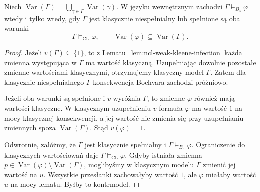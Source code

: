 \begin{twierdzenie}
\label{thm:ncl-bochvar-variable-inclusion}
Niech $\operatorname{Var}(\Gamma)=
\bigcup_{\gamma\in\Gamma}\operatorname{Var}(\gamma)$.
W języku wewnętrznym zachodzi
$\Gamma\models_{B_3}\varphi$ wtedy i tylko wtedy,
gdy $\Gamma$ jest klasycznie niespełnialny
lub spełnione są oba warunki
\[
 \Gamma\models_{\mathrm{CL}}\varphi,\qquad
 \operatorname{Var}(\varphi)\subseteq
 \operatorname{Var}(\Gamma).
\]
\end{twierdzenie}
\begin{proof}
Jeżeli $v(\Gamma)\subseteq\{1\}$, to z
Lematu~\ref{lem:ncl-weak-kleene-infection}
każda zmienna występująca w $\Gamma$ ma wartość
klasyczną. Uzupełniając dowolnie pozostałe zmienne
wartościami klasycznymi, otrzymujemy klasyczny
model $\Gamma$. Zatem dla klasycznie niespełnialnego
$\Gamma$ konsekwencja Bochvara zachodzi próżniowo.

Jeżeli oba warunki są spełnione i $v$ wyróżnia
$\Gamma$, to zmienne $\varphi$ również mają
wartości klasyczne. W klasycznym uzupełnieniu
$v$ formuła $\varphi$ ma wartość $1$ na mocy
klasycznej konsekwencji, a jej wartość nie zmienia
się przy uzupełnianiu zmiennych spoza
$\operatorname{Var}(\Gamma)$. Stąd $v(\varphi)=1$.

Odwrotnie, załóżmy, że $\Gamma$ jest klasycznie
spełnialny i $\Gamma\models_{B_3}\varphi$.
Ograniczenie do klasycznych wartościowań daje
$\Gamma\models_{\mathrm{CL}}\varphi$.
Gdyby istniała zmienna
$p\in\operatorname{Var}(\varphi)\setminus
\operatorname{Var}(\Gamma)$, moglibyśmy w
klasycznym modelu $\Gamma$ zmienić jej wartość
na $u$. Wszystkie przesłanki zachowałyby wartość
$1$, ale $\varphi$ miałaby wartość $u$ na mocy
lematu. Byłby to kontrmodel.
\end{proof}

